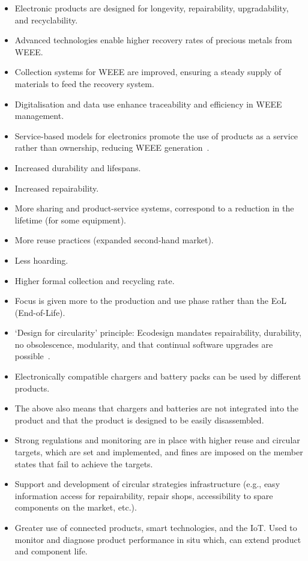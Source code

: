 \begin{itemize}
  \item Electronic products are designed for longevity, repairability, upgradability, and recyclability.
  \item Advanced technologies enable higher recovery rates of precious metals from WEEE.
  \item Collection systems for WEEE are improved, ensuring a steady supply of materials to feed the recovery system.
  \item Digitalisation and data use enhance traceability and efficiency in WEEE management.
  \item Service-based models for electronics promote the use of products as a service rather than ownership, reducing WEEE generation~\cite{geissdorfer2020circbusinessmodels}.
  \item Increased durability and lifespans.
  \item Increased repairability.
  \item More sharing and product-service systems, correspond to a reduction in the lifetime (for some equipment).
  \item More reuse practices (expanded second-hand market).
  \item Less hoarding.
  \item Higher formal collection and recycling rate.
  \item Focus is given more to the production and use phase rather than the EoL (End-of-Life).
  \item `Design for circularity' principle: Ecodesign mandates repairability, durability, no obsolescence, modularity, and that continual software upgrades are possible~\cite{eu2023chargers, eu2023chargerspress}.
  \item Electronically compatible chargers and battery packs can be used by different products.
  \item The above also means that chargers and batteries are not integrated into the product and that the product is designed to be easily disassembled.
  \item Strong regulations and monitoring are in place with higher reuse and circular targets, which are set and implemented, and fines are imposed on the member states that fail to achieve the targets.
  \item Support and development of circular strategies infrastructure (e.g., easy information access for repairability, repair shops, accessibility to spare components on the market, etc.).
  \item Greater use of connected products, smart technologies, and the IoT. Used to monitor and diagnose product performance in situ which, can extend product and component life.
\end{itemize}



